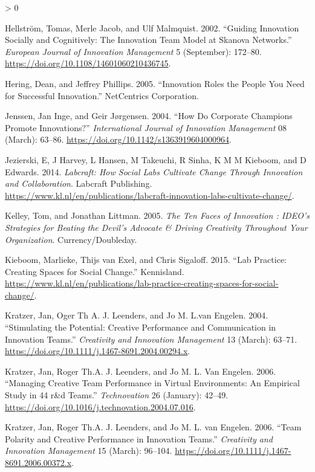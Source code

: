 \documentclass[AMA,STIX1COL,APA,STIX2COL]{WileyNJD-v2}
\newlength{\cslhangindent}
\newenvironment{CSLReferences}[2] %
 {%
  \setlength{\parindent}{0pt}
  \ifodd #1 \everypar{\setlength{\hangindent}{\cslhangindent}}\ignorespaces\fi
  \ifnum #2 > 0
  \setlength{\parskip}{#2\baselineskip}
  \fi
 }%
 {}
\begin{document}
\begin{CSLReferences}{1}{0}
\leavevmode\hypertarget{ref-Hellstrom2002}{}%
Hellström, Tomas, Merle Jacob, and Ulf Malmquist. 2002. {``Guiding
Innovation Socially and Cognitively: The Innovation Team Model at
Skanova Networks.''} \emph{European Journal of Innovation Management} 5
(September): 172--80. \url{https://doi.org/10.1108/14601060210436745}.

\leavevmode\hypertarget{ref-Hering2005}{}%
Hering, Dean, and Jeffrey Phillips. 2005. {``Innovation Roles the People
You Need for Successful Innovation.''} NetCentrics Corporation.

\leavevmode\hypertarget{ref-Jenssen2004}{}%
Jenssen, Jan Inge, and Geir Jørgensen. 2004. {``How Do Corporate
Champions Promote Innovations?''} \emph{International Journal of
Innovation Management} 08 (March): 63--86.
\url{https://doi.org/10.1142/s1363919604000964}.

\leavevmode\hypertarget{ref-Jezierski2014}{}%
Jezierski, E, J Harvey, L Hansen, M Takeuchi, R Sinha, K M M Kieboom,
and D Edwards. 2014. \emph{Labcraft: How Social Labs Cultivate Change
Through Innovation and Collaboration}. Labcraft Publishing.
\url{https://www.kl.nl/en/publications/labcraft-innovation-labs-cultivate-change/}.

\leavevmode\hypertarget{ref-Kelley2005}{}%
Kelley, Tom, and Jonathan Littman. 2005. \emph{The Ten Faces of
Innovation : IDEO's Strategies for Beating the Devil's Advocate \&
Driving Creativity Throughout Your Organization}. Currency/Doubleday.

\leavevmode\hypertarget{ref-Kieboom2015}{}%
Kieboom, Marlieke, Thijs van Exel, and Chris Sigaloff. 2015. {``Lab
Practice: Creating Spaces for Social Change.''} Kennisland.
\url{https://www.kl.nl/en/publications/lab-practice-creating-spaces-for-social-change/}.

\leavevmode\hypertarget{ref-Kratzer2004}{}%
Kratzer, Jan, Oger Th A. J. Leenders, and Jo M. L.van Engelen. 2004.
{``Stimulating the Potential: Creative Performance and Communication in
Innovation Teams.''} \emph{Creativity and Innovation Management} 13
(March): 63--71. \url{https://doi.org/10.1111/j.1467-8691.2004.00294.x}.

\leavevmode\hypertarget{ref-Kratzer2006-A}{}%
Kratzer, Jan, Roger Th.A. J. Leenders, and Jo M. L. Van Engelen. 2006.
{``Managing Creative Team Performance in Virtual Environments: An
Empirical Study in 44 r\&d Teams.''} \emph{Technovation} 26 (January):
42--49. \url{https://doi.org/10.1016/j.technovation.2004.07.016}.

\leavevmode\hypertarget{ref-Kratzer2006-B}{}%
Kratzer, Jan, Roger Th.A. J. Leenders, and Jo M. L. van Engelen. 2006.
{``Team Polarity and Creative Performance in Innovation Teams.''}
\emph{Creativity and Innovation Management} 15 (March): 96--104.
\url{https://doi.org/10.1111/j.1467-8691.2006.00372.x}.


\end{CSLReferences}
\end{document}

